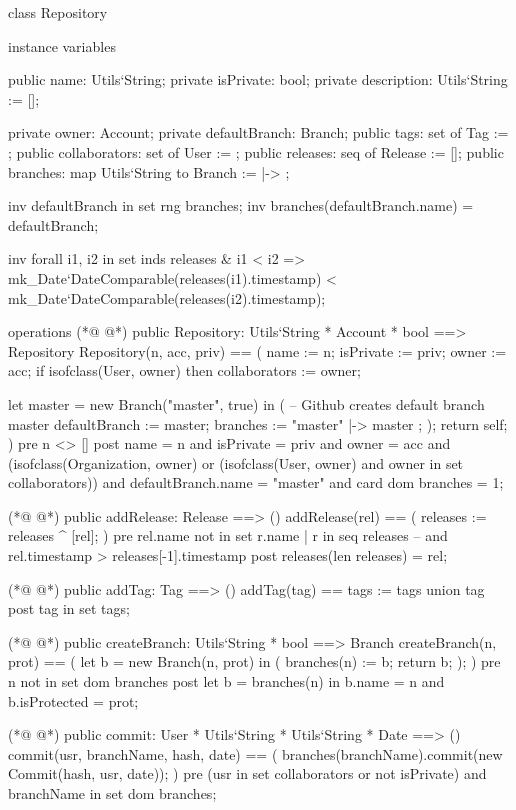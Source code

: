 \begin{vdmpp}[breaklines=true]
class Repository
 
 instance variables
  
  public name: Utils`String;
  private isPrivate: bool;
  private description: Utils`String := [];
 
  private owner: Account;
  private defaultBranch: Branch;
  public tags: set of Tag := {};
  public collaborators: set of User := {};
  public releases: seq of Release := [];
  public branches: map Utils`String to Branch := { |-> };
   
  inv defaultBranch in set rng branches;
  inv branches(defaultBranch.name) = defaultBranch;
 
  inv forall i1, i2 in set inds releases & 
   i1 < i2 => mk_Date`DateComparable(releases(i1).timestamp) < mk_Date`DateComparable(releases(i2).timestamp);
  
 operations
(*@
\label{Repository:23}
@*)
  public Repository: Utils`String * Account * bool ==> Repository
  Repository(n, acc, priv) == (
   name := n;
   isPrivate := priv;
   owner := acc;
   if isofclass(User, owner) then collaborators := {owner};
    
   let master = new Branch("master", true) in ( -- Github creates default branch master
    defaultBranch := master;
    branches := { "master" |-> master };
   );
   return self;
  )
  pre n <> []
  post name = n and isPrivate = priv and owner = acc and
   (isofclass(Organization, owner) or (isofclass(User, owner) and owner in set collaborators)) and
   defaultBranch.name = "master" and card dom branches = 1;
   
  
(*@
\label{addRelease:42}
@*)
  public addRelease: Release ==> ()
  addRelease(rel) == (
   releases := releases ^ [rel];
  )
  pre rel.name not in set {r.name | r in seq releases} -- and rel.timestamp > releases[-1].timestamp
  post releases(len releases) = rel;
  
(*@
\label{addTag:49}
@*)
  public addTag: Tag ==> ()
  addTag(tag) == tags := tags union {tag}
  post tag in set tags;
   
(*@
\label{createBranch:53}
@*)
  public createBranch: Utils`String * bool ==> Branch
  createBranch(n, prot) == (
   let b = new Branch(n, prot) in (
    branches(n) := b;
    return b;
   );
  )
  pre n not in set dom branches
  post let b = branches(n) in b.name = n and b.isProtected = prot;
  
(*@
\label{commit:63}
@*)
  public commit: User * Utils`String * Utils`String * Date ==> ()
  commit(usr, branchName, hash, date) == (
   branches(branchName).commit(new Commit(hash, usr, date));
  )
  pre (usr in set collaborators or not isPrivate) and
   branchName in set dom branches;
   

\end{vdmpp}
